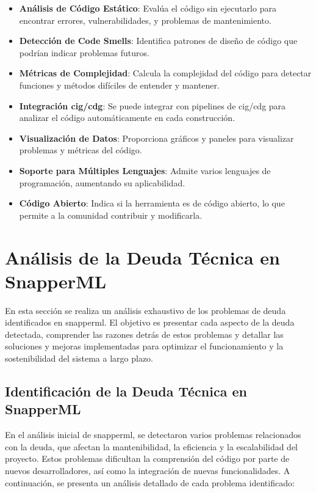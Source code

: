 \begin{itemize}
    \item \textbf{Análisis de Código Estático}: Evalúa el código sin ejecutarlo para encontrar errores, vulnerabilidades, y problemas de mantenimiento.
    \item \textbf{Detección de Code Smells}: Identifica patrones de diseño de código que podrían indicar problemas futuros.
    \item \textbf{Métricas de Complejidad}: Calcula la complejidad del código para detectar funciones y métodos difíciles de entender y mantener.
    \item \textbf{Integración \Gls{cig}/\Gls{cdg}}: Se puede integrar con pipelines de \Gls{cig}/\Gls{cdg} para analizar el código automáticamente en cada construcción.
    \item \textbf{Visualización de Datos}: Proporciona gráficos y paneles para visualizar problemas y métricas del código.
    \item \textbf{Soporte para Múltiples Lenguajes}: Admite varios lenguajes de programación, aumentando su aplicabilidad.
    \item \textbf{Código Abierto}: Indica si la herramienta es de código abierto, lo que permite a la comunidad contribuir y modificarla.
\end{itemize}
\section{Análisis de la Deuda Técnica en SnapperML}
En esta sección se realiza un análisis exhaustivo de los problemas de \gls{deuda} identificados en \Gls{snapperml}. El objetivo es presentar cada aspecto de la \gls{deuda} detectada, comprender las razones detrás de estos problemas y detallar las soluciones y mejoras implementadas para optimizar el funcionamiento y la sostenibilidad del sistema a largo plazo.

\subsection{Identificación de la Deuda Técnica en SnapperML} 
En el análisis inicial de \Gls{snapperml}, se detectaron varios problemas relacionados con la \gls{deuda}, que afectan la mantenibilidad, la eficiencia y la escalabilidad del proyecto. Estos problemas dificultan la comprensión del código por parte de nuevos desarrolladores, así como la integración de nuevas funcionalidades. A continuación, se presenta un análisis detallado de cada problema identificado:

